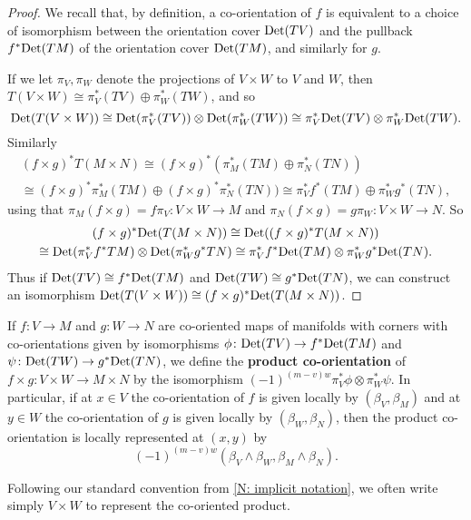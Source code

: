 \begin{proof}
	We recall that, by definition, a co-orientation of $f$ is equivalent to a choice of isomorphism between the orientation cover ${\rm Det}(TV)$ and the pullback $f^*{\rm Det}(TM)$ of the orientation cover ${\rm Det}(TM)$, and similarly for $g$.

	If we let $\pi_V, \pi_W$ denote the projections of $V \times W$ to $V$ and $W$, then $T(V \times W) \cong \pi_V^*(TV) \oplus \pi_W^*(TW)$, and so $${\rm Det}(T(V \times W)) \cong {\rm Det}(\pi_V^*(TV))\otimes{\rm Det}(\pi_W^*(TW)) \cong \pi_V^*{\rm Det}(TV)\otimes\pi_W^*{\rm Det}(TW).$$ Similarly
	\begin{multline*}(f \times g)^*T(M \times N) \cong (f \times g)^*(\pi_M^*(TM) \oplus \pi_N^*(TN))\\
		 \cong (f \times g)^*\pi_M^*(TM) \oplus (f \times g)^*\pi_N^*(TN)) \cong \pi_V^*f^*(TM) \oplus \pi_W^*g^*(TN),
	\end{multline*}
	using that $\pi_M(f \times g) = f\pi_V \colon V \times W \to M$ and $\pi_N(f \times g) = g\pi_W \colon V \times W \to N$.
	So
	\begin{multline*}
		(f \times g)^*{\rm Det}(T(M \times N)) \cong {\rm Det}((f \times g)^*T(M \times N))\\ \cong {\rm Det}(\pi_V^*f^*TM) \otimes {\rm Det}(\pi_W^*g^*TN) \cong \pi_V^*f^*{\rm Det}(TM) \otimes \pi_W^*g^*{\rm Det}(TN).
	\end{multline*}
	Thus if ${\rm Det}(TV) \cong f^*{\rm Det}(TM)$ and ${\rm Det}(TW) \cong g^*{\rm Det}(TN)$, we can construct an isomorphism ${\rm Det}(T(V \times W)) \cong (f \times g)^*{\rm Det}(T(M \times N))$.
\end{proof}

\begin{definition}\label{D: co-oriented exterior}
	If $f \colon V \to M$ and $g \colon W \to N$ are co-oriented maps of manifolds with corners with co-orientations given by isomorphisms $\phi \colon {\rm Det}(TV) \to f^*{\rm Det}(TM)$ and $\psi \colon {\rm Det}(TW) \to g^*{\rm Det}(TN)$, we define the \textbf{product co-orientation} of $f \times g \colon V \times W \to M \times N$ by the isomorphism $(-1)^{(m-v)w}\pi_V^*\phi \otimes \pi_W^*\psi$.
	In particular, if at $x \in V$ the co-orientation of $f$ is given locally by $(\beta_V,\beta_M)$ and at $y \in W$ the co-orientation of $g$ is given locally by $(\beta_W,\beta_N)$, then the product co-orientation is locally represented at $(x,y)$ by $$(-1)^{(m-v)w}(\beta_V \wedge \beta_W,\beta_M \wedge \beta_N).$$

	Following our standard convention from \cref{N: implicit notation}, we often write simply $V \times W$ to represent the co-oriented product. 
\end{definition}

